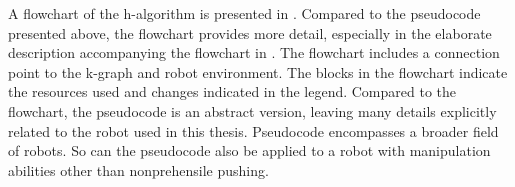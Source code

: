 A flowchart of the \ac{h-algorithm} is presented in . Compared to the pseudocode presented above, the flowchart provides more detail, especially in the elaborate description accompanying the flowchart in . The flowchart includes a connection point to the \ac{k-graph} and robot environment. The blocks in the flowchart indicate the resources used and changes indicated in the legend. Compared to the flowchart, the pseudocode is an abstract version, leaving many details explicitly related to the robot used in this thesis. Pseudocode encompasses a broader field of robots. So can the pseudocode also be applied to a robot with manipulation abilities other than nonprehensile pushing.\bs



